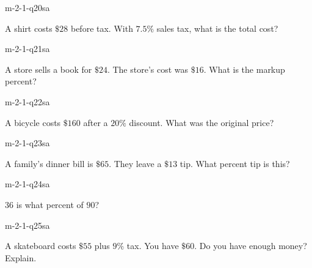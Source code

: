 \begin{practiceQuestion}{m-2-1-q20}{sa}
\begin{questionText}
A shirt costs $\$28$ before tax. With $7.5\%$ sales tax, what is the total cost?
\end{questionText}
\end{practiceQuestion}

\begin{practiceQuestion}{m-2-1-q21}{sa}
\begin{questionText}
A store sells a book for $\$24$. The store's cost was $\$16$. What is the markup percent?
\end{questionText}
\end{practiceQuestion}

\begin{practiceQuestion}{m-2-1-q22}{sa}
\begin{questionText}
A bicycle costs $\$160$ after a $20\%$ discount. What was the original price?
\end{questionText}
\end{practiceQuestion}

\begin{practiceQuestion}{m-2-1-q23}{sa}
\begin{questionText}
A family's dinner bill is $\$65$. They leave a $\$13$ tip. What percent tip is this?
\end{questionText}
\end{practiceQuestion}

\begin{practiceQuestion}{m-2-1-q24}{sa}
\begin{questionText}
$36$ is what percent of $90$?
\end{questionText}
\end{practiceQuestion}

\begin{practiceQuestion}{m-2-1-q25}{sa}
\begin{questionText}
A skateboard costs $\$55$ plus $9\%$ tax. You have $\$60$. Do you have enough money? Explain.
\end{questionText}
\end{practiceQuestion}

